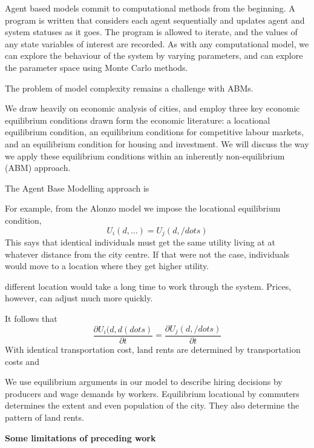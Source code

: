Agent based models commit to computational methods from the beginning.  A program is written that considers each agent sequentially and updates agent and system statuses as it goes. The program is  allowed to iterate, and the values of any state variables of interest are recorded. As with any computational model, we can  explore the behaviour of the system by varying parameters, and  can explore the parameter space using Monte Carlo methods.

The problem of model complexity remains a challenge with ABMs.  



We draw heavily on economic analysis of cities, and employ three key economic equilibrium conditions drawn form the economic literature:  a locational equilibrium condition, an equilibrium conditions for competitive labour markets, and an equilibrium condition for housing and investment. We will discuss the way we apply  these equilibrium conditions within an inherently non-equilibrium (ABM) approach.

   
The Agent Base Modelling approach is 

For example, from the Alonzo model we impose the locational equilibrium condition,
\[U_i(d,\dots)=U_j(d, /dots)\]
This says that identical individuals must get the same utility living at at whatever distance from the city centre. If that were not the case, individuals would move to a location where they get higher utility.

different location would take a long time to work through the system. Prices, however, can adjust much more quickly. 

 It follows that 
\[\frac{\partial U_i(d, d(dots)}{\partial t}=\frac{\partial U_j(d, /dots)}{\partial t}\]
With identical transportation cost, 
land rents are determined by transportation costs  and  

We use  equilibrium arguments in our model to describe hiring decisions by producers and wage demands by workers. Equilibrium locational by commuters determines the extent and even population of the city. They also determine the pattern of land rents. 


\textbf{Some limitations of preceding work}%


